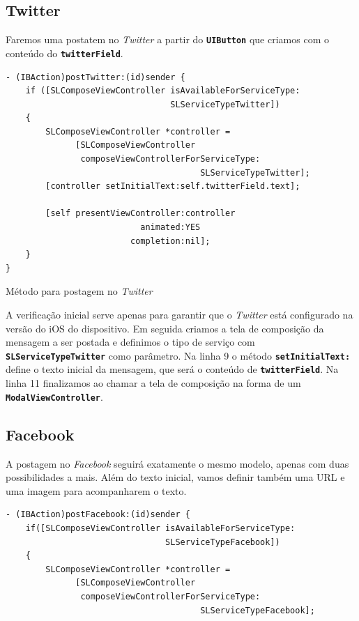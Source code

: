 \documentclass[a4paper,12pt,brazil,doubleside]{book}
\begin{document}
\begin{singlespace}
\subsection{Twitter}


Faremos uma postatem no \emph{Twitter} a partir do \texttt{\textbf{UIButton}} que criamos com o conteúdo do \texttt{\textbf{twitterField}}. 

\begin{listing}[H]
\begin{verbatim}
- (IBAction)postTwitter:(id)sender {
    if ([SLComposeViewController isAvailableForServiceType:
                                 SLServiceTypeTwitter])
    {
        SLComposeViewController *controller = 
              [SLComposeViewController
               composeViewControllerForServiceType:
                                       SLServiceTypeTwitter];
        [controller setInitialText:self.twitterField.text];
        
        [self presentViewController:controller
                           animated:YES
                         completion:nil];
    }
}
\end{verbatim}
\caption{Método para postagem no \emph{Twitter}}
\end{listing}


A verificação inicial serve apenas para garantir que o \emph{Twitter} está configurado na versão do iOS do dispositivo. Em seguida criamos a tela de composição da mensagem a ser postada e definimos o tipo de serviço com \texttt{\textbf{SLServiceTypeTwitter}} como parâmetro. Na linha 9 o método \texttt{\textbf{setInitialText:}} define o texto inicial da mensagem, que será o conteúdo de \texttt{\textbf{twitterField}}. Na linha 11 finalizamos ao chamar a tela de composição na forma de um \texttt{\textbf{ModalViewController}}.

\subsection{Facebook}


A postagem no \emph{Facebook} seguirá exatamente o mesmo modelo, apenas com duas possibilidades a mais. Além do texto inicial, vamos definir também uma URL e uma imagem para acompanharem o texto.

\begin{listing}[H]
\begin{verbatim}
- (IBAction)postFacebook:(id)sender {
    if([SLComposeViewController isAvailableForServiceType:
                                SLServiceTypeFacebook])
    {
        SLComposeViewController *controller =
              [SLComposeViewController
               composeViewControllerForServiceType:
                                       SLServiceTypeFacebook];
        

\end{verbatim}
\end{listing}
\end{singlespace}
\end{document}
